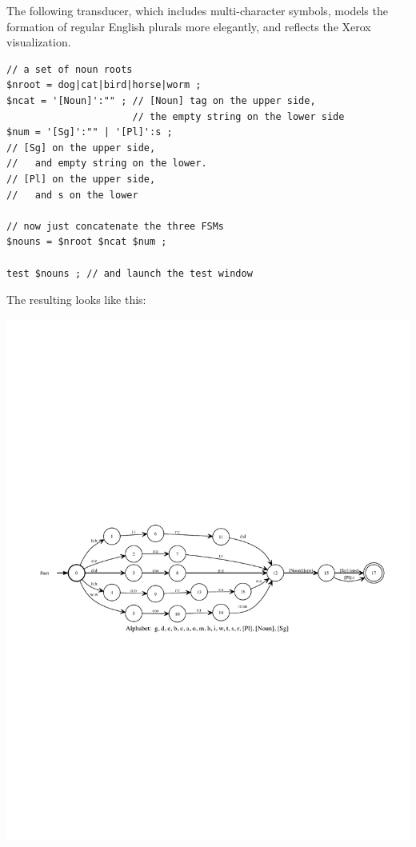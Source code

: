 The following transducer, which includes multi-character symbols,
models the formation of regular English plurals more elegantly, and
reflects the Xerox
visualization.

\begin{Verbatim}
// a set of noun roots
$nroot = dog|cat|bird|horse|worm ;
$ncat = '[Noun]':"" ; // [Noun] tag on the upper side,
                      // the empty string on the lower side
$num = '[Sg]':"" | '[Pl]':s	; 
// [Sg] on the upper side, 
//   and empty string on the lower.
// [Pl] on the upper side, 
//   and s on the lower

// now just concatenate the three FSMs
$nouns = $nroot $ncat $num ;

test $nouns ; // and launch the test window
\end{Verbatim}

\noindent
The resulting \fst{} looks like this:

\begin{center}
\includegraphics[width=135mm]{images/simplenounsgpl.pdf}
\end{center}


